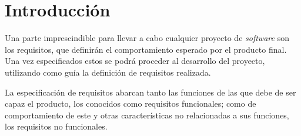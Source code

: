 
\section{Introducción}

Una parte imprescindible para llevar a cabo cualquier proyecto de \textit{software} son los requisitos, que definirán el comportamiento esperado por el producto final. Una vez especificados estos se podrá proceder al desarrollo del proyecto, utilizando como guía la definición de requisitos realizada.

La especificación de requisitos abarcan tanto las funciones de las que debe de ser capaz el producto, los conocidos como requisitos funcionales; como de comportamiento de este y otras características no relacionadas a sus funciones, los requisitos no funcionales.
%

